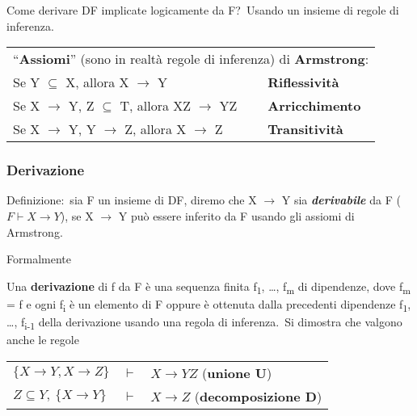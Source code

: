 Come derivare DF implicate logicamente da F?\
Usando un insieme di regole di inferenza.

\begin{table}[H]
	\centering
	\begin{tabular}{l l}
		\multicolumn{2}{c}{``\textbf{Assiomi}'' (sono in realtà regole di inferenza) di \textbf{Armstrong}:} \\
		Se Y $\subseteq$ X, allora X $\rightarrow$ Y                       & \textbf{Riflessività}           \\
		Se X $\rightarrow$ Y, Z $\subseteq$ T, allora XZ $\rightarrow$ YZ  & \textbf{Arricchimento}          \\
		Se X $\rightarrow$ Y, Y $\rightarrow$ Z, allora  X $\rightarrow$ Z & \textbf{Transitività}           \\
	\end{tabular}
\end{table}

\subsubsection{Derivazione}

Definizione:\ sia F un insieme di DF, diremo che X $\rightarrow$ Y sia \textbf{\textit{derivabile}} da F ($F \vdash X \rightarrow Y$), se X $\rightarrow$ Y può essere inferito da F usando gli assiomi di Armstrong.\

\begin{center}
	Formalmente
\end{center}

\noindent Una \textbf{derivazione} di f da F è una sequenza finita f\textsubscript{1}, \dots, f\textsubscript{m} di dipendenze, dove f\textsubscript{m} = f e ogni f\textsubscript{i} è un elemento di F oppure è ottenuta dalla precedenti dipendenze f\textsubscript{1}, \dots, f\textsubscript{i-1} della derivazione usando una regola di inferenza.\
Si dimostra che valgono anche le regole

\begin{table}[H]
	\centering
	\begin{tabular}{l c l}
		$\{X \rightarrow Y, X \rightarrow Z\}$ & $\vdash$ & $X \rightarrow YZ$ (\textbf{unione U})        \\
		$Z \subseteq Y,\ \{X \rightarrow Y\}$  & $\vdash$ & $X \rightarrow Z$ (\textbf{decomposizione D}) \\
	\end{tabular}
\end{table}

